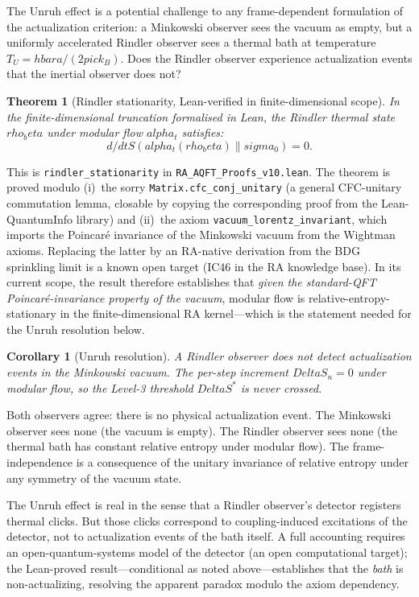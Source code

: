 \documentclass[11pt]{article}
\DeclareRobustCommand{\hbar}{\ensuremath{\hslash}}
\def\hbar{hbar}%
\def\Delta{Delta}%
\def\rho{rho}%
\def\sigma{sigma}%
\def\alpha{alpha}%
\def\beta{beta}%
\def\pi{pi}%
\def\frac#1#2{#1/#2}%
\newtheorem{theorem}{Theorem}
\newtheorem{corollary}{Corollary}
\begin{document}
The Unruh effect is a potential challenge to any frame-dependent formulation of the actualization criterion: a Minkowski observer sees the vacuum as empty, but a uniformly accelerated Rindler observer sees a thermal bath at temperature $T_U = \hbar a/(2\pi c k_B)$. Does the Rindler observer experience actualization events that the inertial observer does not?

\begin{theorem}[Rindler stationarity, Lean-verified in finite-dimensional scope]
\label{thm:rindler}
In the finite-dimensional truncation formalised in Lean, the Rindler thermal state $\rho_\beta$ under modular flow $\alpha_t$ satisfies:
\begin{equation}
\frac{d}{dt} S(\alpha_t(\rho_\beta) \| \sigma_0) = 0.
\end{equation}
\end{theorem}
This is \texttt{rindler\_stationarity} in \texttt{RA\_AQFT\_Proofs\_v10.lean}. The theorem is proved modulo (i)~the sorry \texttt{Matrix.cfc\_conj\_unitary} (a general CFC-unitary commutation lemma, closable by copying the corresponding proof from the Lean-QuantumInfo library) and (ii)~the axiom \texttt{vacuum\_lorentz\_invariant}, which imports the Poincar\'e invariance of the Minkowski vacuum from the Wightman axioms. Replacing the latter by an RA-native derivation from the BDG sprinkling limit is a known open target (IC46 in the RA knowledge base). In its current scope, the result therefore establishes that \emph{given the standard-QFT Poincar\'e-invariance property of the vacuum}, modular flow is relative-entropy-stationary in the finite-dimensional RA kernel---which is the statement needed for the Unruh resolution below.

\begin{corollary}[Unruh resolution]
A Rindler observer does not detect actualization events in the Minkowski vacuum. The per-step increment $\Delta S_n = 0$ under modular flow, so the Level-3 threshold $\Delta S^*$ is never crossed.
\end{corollary}

Both observers agree: there is no physical actualization event. The Minkowski observer sees none (the vacuum is empty). The Rindler observer sees none (the thermal bath has constant relative entropy under modular flow). The frame-independence is a consequence of the unitary invariance of relative entropy under any symmetry of the vacuum state.

The Unruh effect is real in the sense that a Rindler observer's detector registers thermal clicks. But those clicks correspond to coupling-induced excitations of the detector, not to actualization events of the bath itself. A full accounting requires an open-quantum-systems model of the detector (an open computational target); the Lean-proved result---conditional as noted above---establishes that the \emph{bath} is non-actualizing, resolving the apparent paradox modulo the axiom dependency.
\end{document}
